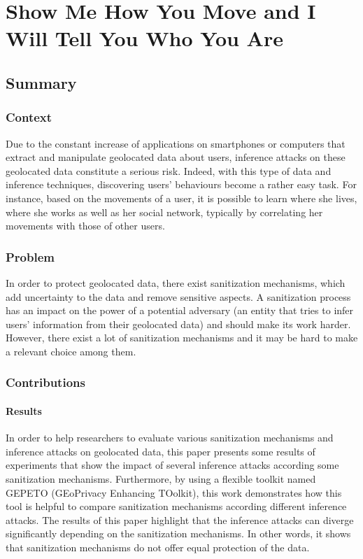 \newpage
\section{Show Me How You Move and I Will Tell You Who You Are \cite{Gambs:2011:SMY:2019316.2019320}} \label{lect3}

\subsection{Summary} \label{lect3-sum}

\subsubsection{Context}
Due to the constant increase of applications on smartphones or computers that extract and manipulate geolocated data about users, inference attacks on these geolocated data constitute a serious risk. Indeed, with this type of data and inference techniques, discovering users' behaviours become a rather easy task. For instance, based on the movements of a user, it is possible to learn where she lives, where she works as well as her social network, typically by correlating her movements with those of other users.

\subsubsection{Problem}
In order to protect geolocated data, there exist sanitization mechanisms, which add uncertainty to the data and remove sensitive aspects. A sanitization process has an impact on the power of a potential adversary (an entity that tries to infer users' information from their geolocated data) and should make its work harder. However, there exist a lot of sanitization mechanisms and it may be hard to make a relevant choice among them.

\subsubsection{Contributions}

\paragraph{Results}
In order to help researchers to evaluate various sanitization mechanisms and inference attacks on geolocated data, this paper presents some results of experiments that show the impact of several inference attacks according some sanitization mechanisms. Furthermore, by using a flexible toolkit named GEPETO (GEoPrivacy Enhancing TOolkit), this work demonstrates how this tool is helpful to compare sanitization mechanisms according different inference attacks. The results of this paper highlight that the inference attacks can diverge significantly depending on the sanitization mechanisms. In other words, it shows that sanitization mechanisms do not offer equal protection of the data.

